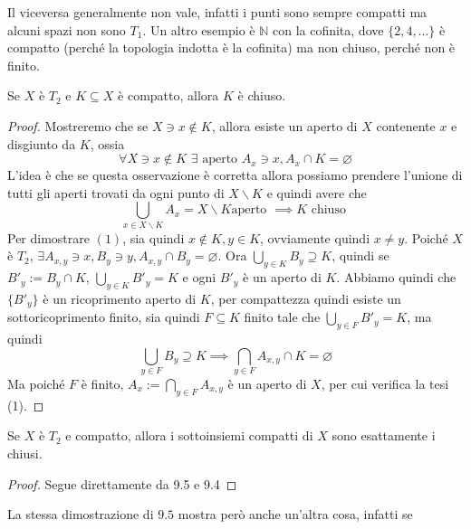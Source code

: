 \begin{remark}
    Il viceversa generalmente non vale, infatti i punti sono sempre compatti ma
    alcuni spazi non sono \(T_{1}\). Un altro esempio è \(\mathbb{N}\) con la
    cofinita, dove \(\{2, 4, \dots\} \) è compatto (perché la topologia indotta
    è la cofinita) ma non chiuso, perché non è finito.
\end{remark}
\begin{theorem}
    Se \(X\) è \(T_{2}\) e \(K \subseteq X \) è compatto, allora \(K\) è chiuso.
\end{theorem}
\begin{proof}
    Mostreremo che se \(X \ni x \not\in K\), allora esiste un aperto di \(X\)
    contenente \(x\) e disgiunto da \(K\), ossia
    \begin{equation}
        \forall X \ni x \not\in K\,\,\exists \text{ aperto }A_x \ni x, A_x \cap  K
        = \varnothing
    \end{equation}
    L'idea è che se questa osservazione è corretta allora possiamo prendere
    l'unione di tutti gli aperti trovati da ogni punto di \(X\smallsetminus K\)
    e quindi avere che
    \[
        \bigcup_{x \in  X \smallsetminus K} A_x = X \smallsetminus K \text{
        aperto } \implies K \text{ chiuso }
    \]
    Per dimostrare \((1)\), sia quindi \(x \not\in K, y \in K\), ovviamente
    quindi \(x \neq y\). Poiché \(X\) è \(T_{2}\), \(\exists A_{x, y} \ni x, B_y
    \ni y, A_{x, y} \cap B_y = \varnothing\). Ora \(\bigcup_{y \in K} B_y
    \supseteq K \), quindi se \(B'_y := B_y \cap K\), \(\bigcup_{y \in K} B'_y =
    K\) e ogni \(B'_y\) è un aperto di \(K\). Abbiamo quindi che \(\{B'_y\} \) è
    un ricoprimento aperto di \(K\), per compattezza quindi esiste un
    sottoricoprimento finito, sia quindi \(F \subseteq K \) finito tale che
    \(\bigcup_{y \in F} B'_y = K\), ma quindi
    \[
        \bigcup_{y \in F} B_y \supseteq K \implies \bigcap_{y \in F} A_{x, y}
        \cap K = \varnothing
    \]
    Ma poiché \(F\) è finito, \(A_x := \bigcap_{y \in F} A_{x, y}\) è un aperto
    di \(X\), per cui verifica la tesi (1).
\end{proof}
\begin{corollary}
    Se \(X\) è \(T_{2}\) e compatto, allora i sottoinsiemi compatti di \(X\)
    sono esattamente i chiusi.
\end{corollary}
\begin{proof}
    Segue direttamente da 9.5 e 9.4
\end{proof}
La stessa dimostrazione di \(9.5\) mostra però anche un'altra cosa, infatti se

